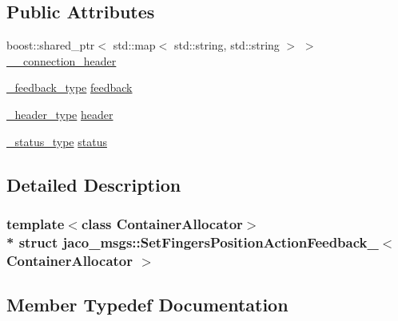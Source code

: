 \subsection*{Public Attributes}
\begin{DoxyCompactItemize}
\item 
boost\+::shared\+\_\+ptr$<$ std\+::map$<$ std\+::string, std\+::string $>$ $>$ \hyperlink{structjaco__msgs_1_1SetFingersPositionActionFeedback___aae197f28fe24e34ec36fd1d8bbfaa71a}{\+\_\+\+\_\+connection\+\_\+header}
\item 
\hyperlink{structjaco__msgs_1_1SetFingersPositionActionFeedback___aa7d354a74533751bde3ebc7132f09e71}{\+\_\+feedback\+\_\+type} \hyperlink{structjaco__msgs_1_1SetFingersPositionActionFeedback___a4c94007aeb334a1eaa98104b7a8cb86c}{feedback}
\item 
\hyperlink{structjaco__msgs_1_1SetFingersPositionActionFeedback___afe617e8a3ac355e40e7b281da489d8a4}{\+\_\+header\+\_\+type} \hyperlink{structjaco__msgs_1_1SetFingersPositionActionFeedback___a19ad5326591e67e1b587b9dd4feaf43a}{header}
\item 
\hyperlink{structjaco__msgs_1_1SetFingersPositionActionFeedback___a7c18f9b312cacc62ecfd8aad585efacb}{\+\_\+status\+\_\+type} \hyperlink{structjaco__msgs_1_1SetFingersPositionActionFeedback___a71d3e9d0ba73d2d1db190090ddbdf943}{status}
\end{DoxyCompactItemize}


\subsection{Detailed Description}
\subsubsection*{template$<$class Container\+Allocator$>$\\*
struct jaco\+\_\+msgs\+::\+Set\+Fingers\+Position\+Action\+Feedback\+\_\+$<$ Container\+Allocator $>$}



\subsection{Member Typedef Documentation}
